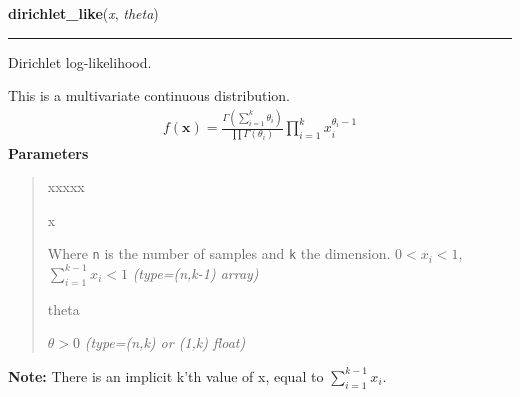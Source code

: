 \hspace{.8\funcindent}\begin{boxedminipage}{\funcwidth}

    \raggedright \textbf{dirichlet\_like}(\textit{x}, \textit{theta})

    \vspace{-1.5ex}

    \rule{\textwidth}{1pt}
\setlength{\parskip}{2ex}

Dirichlet log-likelihood.

This is a multivariate continuous distribution.
\begin{equation*}\begin{split}f(\mathbf{x}) = \frac{\Gamma(\sum_{i=1}^k \theta_i)}{\prod \Gamma(\theta_i)} \prod_{i=1}^k x_i^{\theta_i - 1}\end{split}\end{equation*}\setlength{\parskip}{1ex}
      \textbf{Parameters}
      \vspace{-1ex}

      \begin{quote}
        \begin{Ventry}{xxxxx}

          \item[x]


Where \texttt{n} is the number of samples and \texttt{k} the dimension.
$0 < x_i < 1$,  $\sum_{i=1}^{k-1} x_i < 1$
            {\it (type=(n,k-1) array)}

          \item[theta]


$\theta > 0$
            {\it (type=(n,k) or (1,k) float)}

        \end{Ventry}

      \end{quote}

\textbf{Note:} 
There is an implicit k'th value of x, equal to $\sum_{i=1}^{k-1} x_i$.


    \end{boxedminipage}

    \label{pymc:distributions:discrete_uniform_like}

    \vspace{0.5ex}

